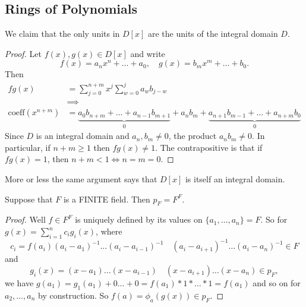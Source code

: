 \subsection*{Rings of Polynomials}
We claim that the only units in $D[x]$ are the units of the integral domain $D$.
\begin{proof}
Let $f(x),g(x) \in D[x]$ and write $$f(x) = a_nx^n + \hdots + a_0, \quad g(x) = b_mx^m + \hdots + b_0.$$
Then \begin{align*} fg(x) &= \sum_{j = 0}^{n+m}x^j \sum_{w = 0}^j a_wb_{j-w} \\
& \implies \\
\text{coeff}(x^{n+m}) &= \underbrace{a_0b_{n+m} + \hdots + a_{n-1}b_{m+1}}_0 + a_nb_m + \underbrace{a_{n+1}b_{m-1} + \hdots + a_{n+m}b_0}_0
\end{align*}
Since $D$ is an integral domain and $a_n,b_m \neq 0$, the product $a_nb_m \neq 0$. In particular, if $n+m \geq 1$ then $fg(x) \neq 1$. The contrapositive is that if $fg(x) = 1$, then $n+m < 1 \iff n = m = 0.$
\end{proof}
More or less the same argument says that $D[x]$ is itself an integral domain.
\begin{theorem}
Suppose that $F$ is a FINITE field. Then $p_F = F^F$.
\end{theorem}
\begin{proof}
Well $f \in F^F$ is uniquely defined by its values on $\{a_1, \hdots, a_n\} = F$. So for $g(x) = \sum_{i=1}^n c_i g_i(x)$, where
$$
c_i = f(a_i)(a_i-a_1)^{-1}\hdots (a_i - a_{i-1})^{-1} \quad (a_i - a_{i+1})^{-1} \hdots (a_i-a_n)^{-1} \in F
$$
and
$$
g_i(x) = (x-a_1)\hdots(x-a_{i-1})\quad (x-a_{i+1})\hdots(x-a_n) \in p_F,
$$
we have $g(a_1) = g_1(a_1) + 0 \hdots + 0 = f(a_1) * 1 * \hdots * 1 = f(a_1)$ and so on for $a_2, \hdots,a_n$ by construction.
So $f(a) = \phi_a(g(x)) \in p_F$.
\end{proof}
